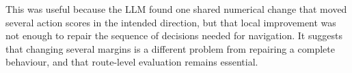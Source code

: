 \documentclass[11pt,a4paper]{article}
\begin{document}
This was useful because the LLM found one shared numerical change that moved several action scores in the intended direction, but that local improvement was not enough to repair the sequence of decisions needed for navigation. It suggests that changing several margins is a different problem from repairing a complete behaviour, and that route-level evaluation remains essential.
\end{document}
